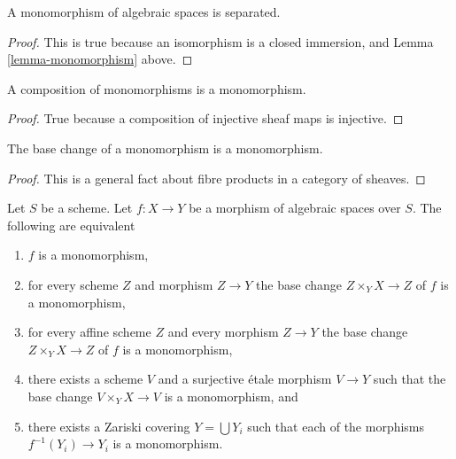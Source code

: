 \begin{lemma}
\label{lemma-monomorphism-separated}
A monomorphism of algebraic spaces is separated.
\end{lemma}

\begin{proof}
This is true because an isomorphism is a closed immersion,
and Lemma \ref{lemma-monomorphism} above.
\end{proof}

\begin{lemma}
\label{lemma-composition-monomorphism}
A composition of monomorphisms is a monomorphism.
\end{lemma}

\begin{proof}
True because a composition of injective sheaf maps is injective.
\end{proof}

\begin{lemma}
\label{lemma-base-change-monomorphism}
The base change of a monomorphism is a monomorphism.
\end{lemma}

\begin{proof}
This is a general fact about fibre products in a category of sheaves.
\end{proof}

\begin{lemma}
\label{lemma-monomorphism-local}
Let $S$ be a scheme.
Let $f : X \to Y$ be a morphism of algebraic spaces over $S$.
The following are equivalent
\begin{enumerate}
\item $f$ is a monomorphism,
\item for every scheme $Z$ and morphism $Z \to Y$ the
base change $Z \times_Y X \to Z$ of $f$ is a monomorphism,
\item for every affine scheme $Z$ and every morphism $Z \to Y$ the
base change $Z \times_Y X \to Z$ of $f$ is a monomorphism,
\item there exists a scheme $V$ and a surjective \'etale morphism
$V \to Y$ such that the base change $V \times_Y X \to V$ is a
monomorphism, and
\item there exists a Zariski covering $Y = \bigcup Y_i$ such that each
of the morphisms $f^{-1}(Y_i) \to Y_i$ is a monomorphism.
\end{enumerate}
\end{lemma}

